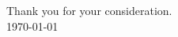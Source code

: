 \documentclass[12pt]{article}
\begin{document}
\noindent Thank you for your consideration. \\

\noindent \today
	

















	
	
	
	
	
\end{document}
